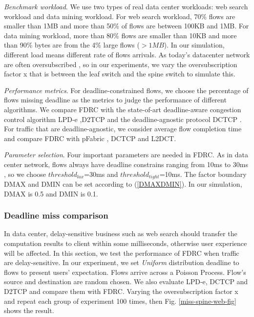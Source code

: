 \documentclass[10pt, conference, letterpaper]{IEEEtran}
\begin{document}
\emph{Benchmark workload}. We use two types of real data center workloads: 
web search workload and data mining workload\cite{DCTCP}\cite{pFabric}. 
For web search workload, 70\% flows are smaller than 1MB and more than 50\% of flows are between 100KB and 1MB. 
For data mining workload, more than 80\% flows are smaller than 10KB and more than 90\% bytes are from the 4\% large flows ($>1MB$).
In our simulation, different load means different rate of flows arrivals.
As today's datacenter network are often oversubscribed \cite{CloudMirror}, so in our experiments, 
we vary the oversubscription factor x  that is between the leaf switch and the spine switch to simulate this.

\emph{Performance metrics}. For deadline-constrained flows, we choose the percentage of flows missing deadline as the metrics to judge the performance of different algorithms.
We compare FDRC with the state-of-art deadline-aware congestion control algorithm LPD-e \cite{LPD},D2TCP \cite{D2TCP} and the deadline-agnostic protocol DCTCP \cite{DCTCP}.
For traffic that are deadline-agnostic, we consider average flow completion time and compare FDRC with pFabric \cite{pFabric}, DCTCP\cite{DCTCP} and L2DCT\cite{L2DCT}. 

\emph{Parameter selection}. Four important parameters are needed in FDRC. 
As in data center network, flows always have deadline constrains ranging from 10ms to 30ms \cite{D3}, 
so we choose $threshold_{lax}$=30ms and $threshold_{tight}$=10ms.
The factor boundary DMAX and DMIN can be set according to (\ref{DMAXDMIN}).
In our simulation, DMAX is 0.5 and DMIN is 0.1.




\subsubsection{Deadline miss comparison}\label{evaluation_deadline}

In data center, delay-sensitive business such as web search should transfer the 
computation results to client within some milliseconds, otherwise user experience will be affected. 
In this section, we test the performance of FDRC when traffic are delay-sensitive. 
In our experiment, we set \emph{Uniform} distribution deadline to flows to present users' expectation.
Flows arrive across a Poisson Process. 
Flow's source and destination are random chosen.
We also evaluate LPD-e, DCTCP and D2TCP  and compare them with FDRC.
Varying the oversubscription factor x and repeat each group of experiment 100 times,
then Fig. \ref{miss-spine-web-fig} shows the result. 
\end{document}
